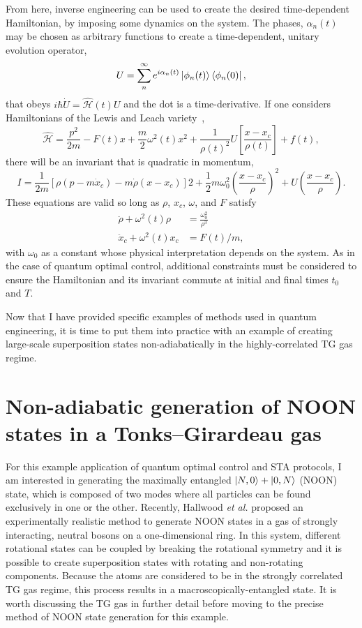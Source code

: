From here, inverse engineering can be used to create the desired time-dependent Hamiltonian, by imposing some dynamics on the system.
The phases, $\alpha_n(t)$ may be chosen as arbitrary functions to create a time-dependent, unitary evolution operator,
\begin{equation}
U = \sum_n^\infty e^{i\alpha_n(t)}\ket{\phi_n(t)}\bra{\phi_n(0)},
\end{equation}
\noindent that obeys $i\hbar \dot U = \mathcal{\hat H}(t)U$ and the dot is a time-derivative.
If one considers Hamiltonians of the Lewis and Leach variety~\cite{lewis1982},
\begin{equation}
\mathcal{\hat H} = \frac{p^2}{2m}  -F(t)x + \frac{m}{2}\omega^2(t)x^2 + \frac{1}{\rho(t)^2}U\left[\frac{x-x_c}{\rho(t)}\right] + f(t),
\label{eqn:HSTA}
\end{equation}
there will be an invariant that is quadratic in momentum,
\begin{equation}
I = \frac{1}{2m}[\rho(p-m\dot x_c)-m\dot \rho(x-x_c)]2 + \frac{1}{2}m\omega_0^2\left( \frac{x-x_c}{\rho} \right)^2 + U\left( \frac{x-x_c}{\rho}\right).
\end{equation}
\noindent These equations are valid so long as $\rho$, $x_c$, $\omega$, and $F$ satisfy
\begin{align}
\ddot \rho + \omega^2(t)\rho &= \frac{\omega_0^2}{\rho^3} \label{eqn:rho}\\
\ddot x_c + \omega^2(t)x_c &= F(t)/m \label{eqn:xc},
\end{align}
\noindent with $\omega_0$ as a constant whose physical interpretation depends on the system.
As in the case of quantum optimal control, additional constraints must be considered to ensure the Hamiltonian and its invariant commute at initial and final times $t_0$ and $T$.

Now that I have provided specific examples of methods used in quantum engineering, it is time to put them into practice with an example of creating large-scale superposition states non-adiabatically in the highly-correlated TG gas regime.

\section{Non-adiabatic generation of NOON states in a Tonks--Girardeau gas}

For this example application of quantum optimal control and STA protocols, I am interested in generating the maximally entangled $\ket{N,0} + \ket{0,N}$ (NOON) state, which is composed of two modes where all particles can be found exclusively in one or the other.
Recently, Hallwood \textit{et al.} proposed an experimentally realistic method to generate NOON states in a gas of strongly interacting, neutral bosons on a one-dimensional ring.
In this system, different rotational states can be coupled by breaking the rotational symmetry and it is possible to create superposition states with rotating and non-rotating components.
Because the atoms are considered to be in the strongly correlated TG gas regime, this process results in a macroscopically-entangled state.
It is worth discussing the TG gas in further detail before moving to the precise method of NOON state generation for this example.

